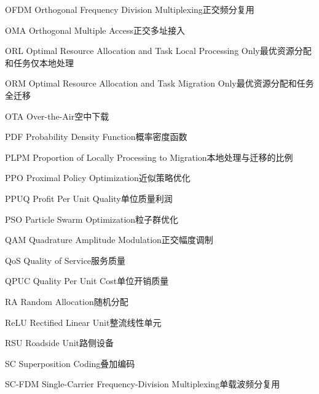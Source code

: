 \begin{abbreviate}[0mm][18mm]
\item[OFDM] Orthogonal Frequency Division Multiplexing\hspace{1em}正交频分复用
\item[OMA] Orthogonal Multiple Access\hspace{1em}正交多址接入
\item[ORL] Optimal Resource Allocation and Task Local Processing Only\hspace{1em}最优资源分配和任务仅本地处理
\item[ORM] Optimal Resource Allocation and Task Migration Only\hspace{1em}最优资源分配和任务全迁移
\item[OTA] Over-the-Air\hspace{1em}空中下载
\item[PDF] Probability Density Function\hspace{1em}概率密度函数
\item[PLPM] Proportion of Locally Processing to Migration\hspace{1em}本地处理与迁移的比例
\item[PPO] Proximal Policy Optimization\hspace{1em}近似策略优化
\item[PPUQ] Profit Per Unit Quality\hspace{1em}单位质量利润
\item[PSO] Particle Swarm Optimization\hspace{1em}粒子群优化
\item[QAM] Quadrature Amplitude Modulation\hspace{1em}正交幅度调制
\item[QoS] Quality of Service\hspace{1em}服务质量
\item[QPUC] Quality Per Unit Cost\hspace{1em}单位开销质量
\item[RA] Random Allocation\hspace{1em}随机分配
\item[ReLU] Rectified Linear Unit\hspace{1em}整流线性单元
\item[RSU] Roadside Unit\hspace{1em}路侧设备
\item[SC] Superposition Coding\hspace{1em}叠加编码
\item[SC-FDM] Single-Carrier Frequency-Division Multiplexing\hspace{1em}单载波频分复用

\end{abbreviate}
